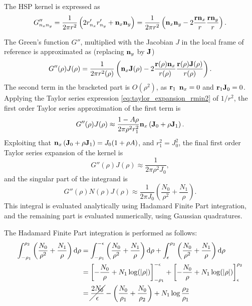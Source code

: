 The HSP kernel is expressed as
%
\begin{equation}
	G''_{n_x n_y} = \frac{1}{2\pi r^2} \left( 2 r'_{n_x} r'_{n_y} + {\bf n}_x {\bf n}_y \right)
	= \frac{1}{2\pi r^2} \left( {\bf n}_x {\bf n}_y - 2 \frac{{\bf r} {\bf n}_x}{r} \frac{{\bf r}{\bf n}_y}{r} \right)
	.
\end{equation}
%

The Green's function $G''$, multiplied with the Jacobian $J$ in the local frame of reference is approximated as (replacing ${\bf n}_y$ by ${\bf J}$)
%
\begin{equation}
	G''(\rho) J(\rho)
	= \frac{1}{2\pi r^2(\rho)} \left( {\bf n}_x {\bf J}(\rho) - 2 \frac{{\bf r}(\rho) {\bf n}_x}{r(\rho)} \frac{{\bf r}(\rho) {\bf J}(\rho)}{r(\rho)}\right)
	.
\end{equation}
%
The second term in the bracketed part is $O(\rho^2)$, as ${\bf r}_1$ ${\bf n}_x = 0$ and ${\bf r}_1 {\bf J}_0 = 0$.
Applying the Taylor series expression \eqref{eq:taylor_expansion_rmin2} of $1/r^2$, the first order Taylor series approximation of the first term is
%
\begin{equation}
	G''(\rho) J(\rho) \approx \frac{1 - A \rho}{2\pi \rho^2 r_1^2} {\bf n}_x \left({\bf J}_0 + \rho {\bf J}_1\right) 
	.
\end{equation}
%
Exploiting that ${\bf n}_x \left({\bf J}_0 + \rho {\bf J}_1\right) = J_0 (1 + \rho A)$, and $r_1^2 = J_0^2$, the final first order Taylor series expansion of the kernel is
%
\begin{equation}
	G''(\rho) J(\rho) \approx \frac{1}{2\pi \rho^2 J_0}
	,
\end{equation}
%
and the singular part of the integrand is
%
\begin{equation}
	G''(\rho) N(\rho) J(\rho) \approx \frac{1}{2\pi J_0} \left( \frac{N_0}{\rho^2} +  \frac{N_1}{\rho} \right)
	.
\end{equation}
%
This integral is evaluated analytically using Hadamard Finite Part integration, and the remaining part is evaluated numerically, using Gaussian quadratures.

The Hadamard Finite Part integration is performed as follows:
%
\begin{align}
	\int_{-\rho_1}^{\rho_2} \left( \frac{N_0}{\rho^2} +  \frac{N_1}{\rho} \right) \mathrm{d} \rho
	&= \int_{-\rho_1}^{-\epsilon} \left( \frac{N_0}{\rho^2} +  \frac{N_1}{\rho} \right) \mathrm{d} \rho
	+ \int_{\epsilon}^{\rho_2} \left( \frac{N_0}{\rho^2} +  \frac{N_1}{\rho} \right) \mathrm{d} \rho \\
	&= \left[ -\frac{N_0}{\rho} +  N_1\log(|\rho|) \right]_{-\rho_1}^{-\epsilon} +
	\left[ -\frac{N_0}{\rho} +  N_1\log(|\rho|) \right]_{\epsilon}^{\rho_2} \\
	&=  \cancel{\frac{2 N_0}{\epsilon} }
	- \left( \frac{N_0}{\rho_1} + \frac{N_0}{\rho_2} \right)
	+  N_1\log \frac{\rho_2}{\rho_1} 
\end{align}
